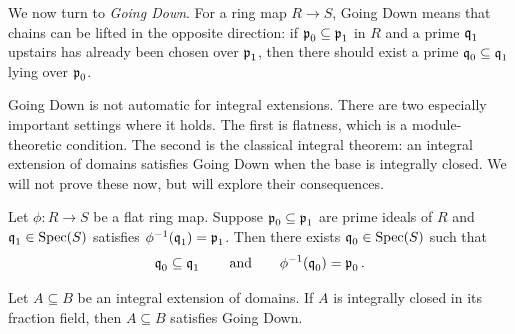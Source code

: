 \documentclass[Notebook.tex]{subfiles}
\begin{document}
\newpage 

\hrulefill

We now turn to \emph{Going Down}. For a ring map $R\to S$, Going Down means that chains can be lifted in the opposite direction: if $\operatorname{\mathfrak{p}}_0\subseteq \operatorname{\mathfrak{p}}_1$ in $R$ and a prime $\operatorname{\mathfrak{q}}_1$ upstairs has already been chosen over $\operatorname{\mathfrak{p}}_1$, then there should exist a prime $\operatorname{\mathfrak{q}}_0\subseteq \operatorname{\mathfrak{q}}_1$ lying over $\operatorname{\mathfrak{p}}_0$.

Going Down is not automatic for integral extensions. There are two especially important settings where it holds. The first is flatness, which is a module-theoretic condition. The second is the classical integral theorem: an integral extension of domains satisfies Going Down when the base is integrally closed. We will not prove these now, but will explore their consequences. 

\begin{theorem}
Let $\phi:R\to S$ be a flat ring map. Suppose $\operatorname{\mathfrak{p}}_0\subseteq \operatorname{\mathfrak{p}}_1$ are prime ideals of $R$ and $\operatorname{\mathfrak{q}}_1\in\operatorname{Spec}(S)$ satisfies $\phi^{-1}(\operatorname{\mathfrak{q}}_1)=\operatorname{\mathfrak{p}}_1$. Then there exists $\operatorname{\mathfrak{q}}_0\in\operatorname{Spec}(S)$ such that
\[
\operatorname{\mathfrak{q}}_0\subseteq \operatorname{\mathfrak{q}}_1
\qquad\text{and}\qquad
\phi^{-1}(\operatorname{\mathfrak{q}}_0)=\operatorname{\mathfrak{p}}_0.
\]
\end{theorem}

\begin{theorem}
Let $A\subseteq B$ be an integral extension of domains. If $A$ is integrally closed in its fraction field, then $A\subseteq B$ satisfies Going Down.
\end{theorem}

\hrulefill

\newpage 
\end{document}
